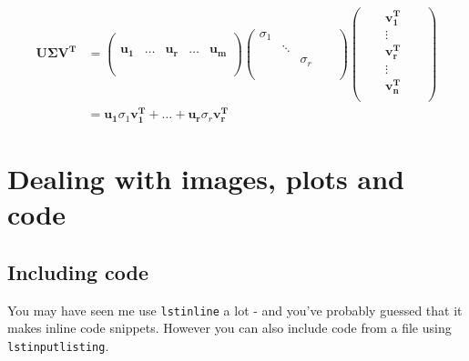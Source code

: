 \documentclass{article}
\begin{document}
\begin{align*}
\mathbf{U\Sigma V^T} &= \begin{pmatrix}
                     & & & &\\
                     & & & &\\
                     \mathbf{u_1} & \ldots & \mathbf{u_r}
                                  & \ldots & \mathbf{u_m}\\
                     & & & &\\
                     & & & &\\
                     \end{pmatrix}
                     \begin{pmatrix}
                     \sigma_1 & & & &\\
                     & \ddots & & &\\
                     & & \sigma_r & &\\
                     & & & &\\
                     \end{pmatrix}
                     \begin{pmatrix}
                     & & \mathbf{v_1^T} & & \\
                     & & \vdots & & \\
                     & & \mathbf{v_r^T} & & \\
                     & & \vdots & & \\
                     & & \mathbf{v_n^T} & & \\
                     \end{pmatrix}\\
                  &= \mathbf{u_1}\sigma_1\mathbf{v_1^T}
                   + \ldots + \mathbf{u_r}\sigma_r\mathbf{v_r^T}
\end{align*}

\newpage
\section*{Dealing with images, plots and code}

\subsection*{Including code}
You may have seen me use \lstinline{lstinline} a lot - and you've probably
guessed that it makes inline code snippets. However you can also include code
from a file using \lstinline{lstinputlisting}.
\end{document}
